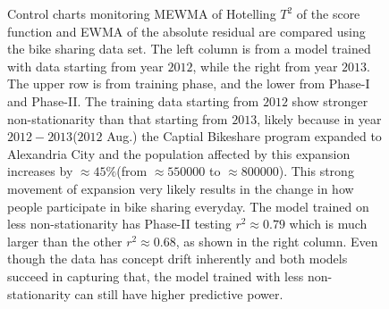 \documentclass[twoside,11pt]{article}
\begin{document}
\begin{figure}[!htbp]
{Control charts monitoring MEWMA of Hotelling $T^2$ of the score function and EWMA of the absolute residual are compared using the bike sharing data set. The left column is from a model trained with data starting from year $2012$, while the right from year $2013$. The upper row is from training phase, and the lower from Phase-I and Phase-II. The training data starting from $2012$ show stronger non-stationarity than that starting from $2013$, likely because in year $2012-2013$($2012$ Aug.) the Captial Bikeshare program expanded to Alexandria City and the population affected by this expansion increases by $\approx45\%$(from $\approx550000$ to $\approx800000$). This strong movement of expansion very likely results in the change in how people participate in bike sharing everyday. The model trained on less non-stationarity has Phase-II testing $r^2\approx0.79$ which is much larger than the other $r^2\approx0.68$, as shown in the right column. Even though the data has concept drift inherently and both models succeed in capturing that, the model trained with less non-stationarity can still have higher predictive power. 
}
\label{fig:bike_sharing}
\end{figure}
\end{document}
